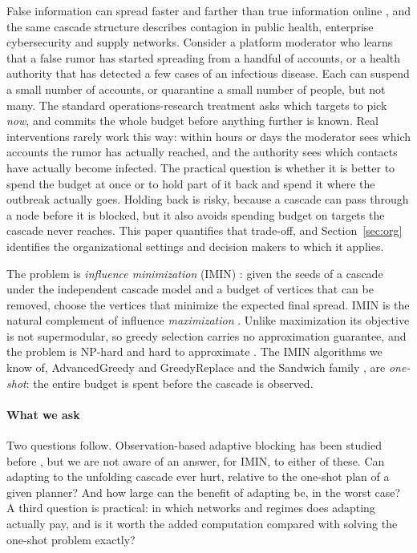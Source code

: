 \documentclass[preprint,11pt]{elsarticle}
\theoremstyle{definition}
\theoremstyle{remark}
\begin{document}
False information can spread faster and farther than true information online \citep{vosoughi2018,lazer2018}, and the same cascade structure describes contagion in public health, enterprise cybersecurity and supply networks. Consider a platform moderator who learns that a false rumor has started spreading from a handful of accounts, or a health authority that has detected a few cases of an infectious disease. Each can suspend a small number of accounts, or quarantine a small number of people, but not many. The standard operations-research treatment asks which targets to pick \emph{now}, and commits the whole budget before anything further is known. Real interventions rarely work this way: within hours or days the moderator sees which accounts the rumor has actually reached, and the authority sees which contacts have actually become infected. The practical question is whether it is better to spend the budget at once or to hold part of it back and spend it where the outbreak actually goes. Holding back is risky, because a cascade can pass through a node before it is blocked, but it also avoids spending budget on targets the cascade never reaches. This paper quantifies that trade-off, and Section~\ref{sec:org} identifies the organizational settings and decision makers to which it applies.

The problem is \emph{influence minimization} (IMIN) \citep{xie2023,xie2024}: given the seeds of a cascade under the independent cascade model and a budget of vertices that can be removed, choose the vertices that minimize the expected final spread. IMIN is the natural complement of influence \emph{maximization} \citep{kempe2003}. Unlike maximization its objective is not supermodular, so greedy selection carries no approximation guarantee, and the problem is NP-hard and hard to approximate \citep{xie2023}. The IMIN algorithms we know of, AdvancedGreedy and GreedyReplace \citep{xie2023,xie2024} and the Sandwich family \citep{wang2024sandwich}, are \emph{one-shot}: the entire budget is spent before the cascade is observed.

\paragraph{What we ask} Two questions follow. Observation-based adaptive blocking has been studied before \citep{shi2019}, but we are not aware of an answer, for IMIN, to either of these. Can adapting to the unfolding cascade ever hurt, relative to the one-shot plan of a given planner? And how large can the benefit of adapting be, in the worst case? A third question is practical: in which networks and regimes does adapting actually pay, and is it worth the added computation compared with solving the one-shot problem exactly?
\end{document}
